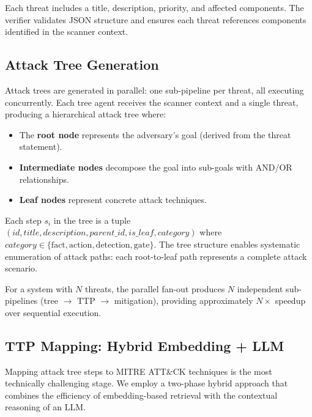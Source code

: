 Each threat includes a title, description, priority, and affected components. The verifier validates JSON structure and ensures each threat references components identified in the scanner context.

\subsection{Attack Tree Generation}
\label{sec:tree}

Attack trees are generated in parallel: one sub-pipeline per threat, all executing concurrently. Each tree agent receives the scanner context and a single threat, producing a hierarchical attack tree where:

\begin{itemize}
    \item The \textbf{root node} represents the adversary's goal (derived from the threat statement).
    \item \textbf{Intermediate nodes} decompose the goal into sub-goals with AND/OR relationships.
    \item \textbf{Leaf nodes} represent concrete attack techniques.
\end{itemize}

Each step $s_i$ in the tree is a tuple $(id, title, description, parent\_id, is\_leaf, category)$ where $category \in \{\text{fact}, \text{action}, \text{detection}, \text{gate}\}$. The tree structure enables systematic enumeration of attack paths: each root-to-leaf path represents a complete attack scenario.

For a system with $N$ threats, the parallel fan-out produces $N$ independent sub-pipelines (tree $\to$ TTP $\to$ mitigation), providing approximately $N\times$ speedup over sequential execution.

\subsection{TTP Mapping: Hybrid Embedding + LLM}
\label{sec:ttp}

Mapping attack tree steps to MITRE ATT\&CK techniques is the most technically challenging stage. We employ a two-phase hybrid approach that combines the efficiency of embedding-based retrieval with the contextual reasoning of an LLM.

